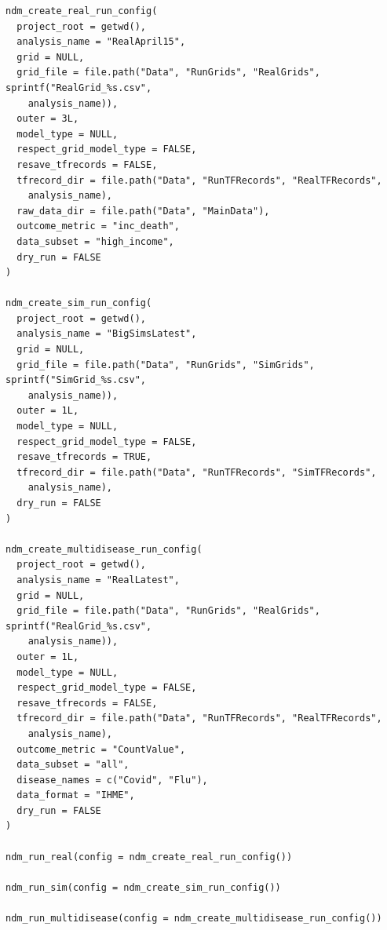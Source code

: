 \documentclass[a4paper]{book}
\begin{document}
\begin{Usage}
\begin{verbatim}
ndm_create_real_run_config(
  project_root = getwd(),
  analysis_name = "RealApril15",
  grid = NULL,
  grid_file = file.path("Data", "RunGrids", "RealGrids", sprintf("RealGrid_%s.csv",
    analysis_name)),
  outer = 3L,
  model_type = NULL,
  respect_grid_model_type = FALSE,
  resave_tfrecords = FALSE,
  tfrecord_dir = file.path("Data", "RunTFRecords", "RealTFRecords",
    analysis_name),
  raw_data_dir = file.path("Data", "MainData"),
  outcome_metric = "inc_death",
  data_subset = "high_income",
  dry_run = FALSE
)

ndm_create_sim_run_config(
  project_root = getwd(),
  analysis_name = "BigSimsLatest",
  grid = NULL,
  grid_file = file.path("Data", "RunGrids", "SimGrids", sprintf("SimGrid_%s.csv",
    analysis_name)),
  outer = 1L,
  model_type = NULL,
  respect_grid_model_type = FALSE,
  resave_tfrecords = TRUE,
  tfrecord_dir = file.path("Data", "RunTFRecords", "SimTFRecords",
    analysis_name),
  dry_run = FALSE
)

ndm_create_multidisease_run_config(
  project_root = getwd(),
  analysis_name = "RealLatest",
  grid = NULL,
  grid_file = file.path("Data", "RunGrids", "RealGrids", sprintf("RealGrid_%s.csv",
    analysis_name)),
  outer = 1L,
  model_type = NULL,
  respect_grid_model_type = FALSE,
  resave_tfrecords = FALSE,
  tfrecord_dir = file.path("Data", "RunTFRecords", "RealTFRecords",
    analysis_name),
  outcome_metric = "CountValue",
  data_subset = "all",
  disease_names = c("Covid", "Flu"),
  data_format = "IHME",
  dry_run = FALSE
)

ndm_run_real(config = ndm_create_real_run_config())

ndm_run_sim(config = ndm_create_sim_run_config())

ndm_run_multidisease(config = ndm_create_multidisease_run_config())
\end{verbatim}
\end{Usage}
%
\end{document}
